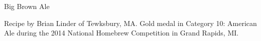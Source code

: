 \begin{recipe}{Big Brown Ale} %

\begin{aboutblock}
Recipe by Brian Linder of Tewksbury, MA. Gold medal in Category 10: American
Ale during the 2014 National Homebrew Competition in Grand Rapids, MI.
\sourceaha
\end{aboutblock}


\begin{methodandtiming}

\begin{mashsteps}
\end{mashsteps}

\begin{fermentationsteps}
\end{fermentationsteps}

\end{methodandtiming}

\recipebreak

\begin{ingredientsblock}

\begin{malts}
\end{malts}

\begin{hops}
\end{hops}


\end{ingredientsblock}

\end{recipe}

